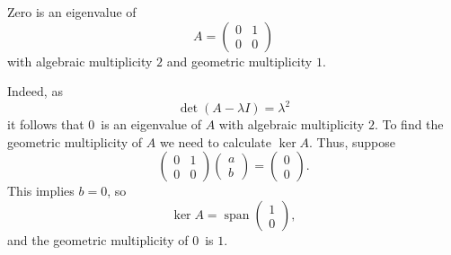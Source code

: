 \documentclass[12pt]{article}
\begin{document}
Zero is an eigenvalue of
$$
  A = \begin{pmatrix} 0 & 1 \\ 0 & 0 \end{pmatrix}
$$
with algebraic multiplicity $2$ and geometric multiplicity $1$. 

Indeed, as
$$
   \det (A-\lambda I) = \lambda^2
$$
it follows that $0\,\!$ 
is an eigenvalue of $A$ with algebraic multiplicity $2$. 
To find the geometric multiplicity of $A$ we need to calculate 
$\operatorname{ker} A$. Thus, suppose 
$$
\begin{pmatrix} 0 & 1 \\ 0 & 0 \end{pmatrix} \begin{pmatrix} a \\ b \end{pmatrix}= \begin{pmatrix} 0  \\ 0 \end{pmatrix}.
$$
This implies $b=0$, so 
$$
   \ker A = \operatorname{span} \begin{pmatrix} 1  \\ 0 \end{pmatrix},
$$
and the geometric multiplicity of $0\,\!$ is $1$.
\end{document}
